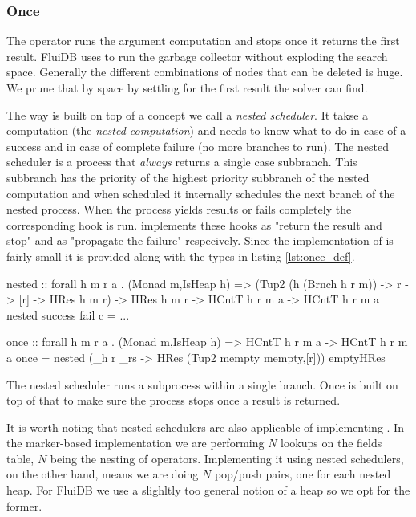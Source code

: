\subsubsection{Once}

The  operator runs the argument computation and stops once it
returns the first result. FluiDB uses  to run the garbage
collector without exploding the search space. Generally the different
combinations of nodes that can be deleted is huge. We prune that by
space by settling for the first result the solver can find.

The way  is built on top of a concept we call a
\emph{nested scheduler}. It takse a computation (the \emph{nested
  computation}) and needs to know what to do in case of a success and
in case of complete failure (no more branches to run). The nested
scheduler is a process that \emph{always} returns a single case
subbranch. This subbranch has the priority of the highest priority
subbranch of the nested computation and when scheduled it internally
schedules the next branch of the nested process. When the process
yields results or fails completely the corresponding hook is
run.  implements these hooks as "return the result and
stop" and as "propagate the failure" respecively. Since the
implementation of  is fairly small it is provided along
with the types in listing \ref{lst:once_def}.

\begin{code}
\begin{haskellcode}
nested
  :: forall h m r a .
  (Monad m,IsHeap h)
  => (Tup2 (h (Brnch h r m)) -> r -> [r] -> HRes h m r)
  -> HRes h m r
  -> HCntT h r m a
  -> HCntT h r m a
nested success fail c = ...

once :: forall h m r a . (Monad m,IsHeap h) => HCntT h r m a -> HCntT h r m a
once = nested (\_h r _rs -> HRes (Tup2 mempty mempty,[r])) emptyHRes
\end{haskellcode}
\caption{\label{lst:once_def}The nested scheduler runs a subprocess within a single branch. Once is built on top of that to make sure the process stops once a result is returned.}
\end{code}


It is worth noting that nested schedulers are also applicable of
implementing \hask{<//>}. In the marker-based implementation we are
performing \(N\) lookups on the fields table, \(N\) being the nesting
of \hask{<//>} operators. Implementing it using nested schedulers, on the
other hand, means we are doing \(N\) pop/push pairs, one for each
nested heap. For FluiDB we use a slighltly too general notion of a
heap so we opt for the former.
